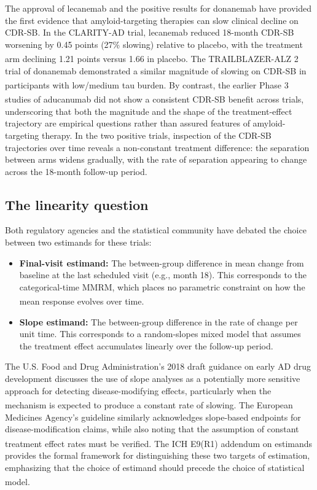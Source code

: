 \documentclass[
  11pt,
]{article}
\begin{document}
The approval of lecanemab and the positive results for
donanemab have provided the first evidence that
amyloid-targeting therapies can slow clinical decline on
CDR-SB. In the CLARITY-AD trial, lecanemab reduced 18-month
CDR-SB worsening by 0.45 points (27\% slowing) relative to
placebo, with the treatment arm declining 1.21 points
versus 1.66 in placebo\textsuperscript{}. The
TRAILBLAZER-ALZ 2 trial of donanemab demonstrated a similar
magnitude of slowing on CDR-SB in participants with
low/medium tau burden\textsuperscript{}. By contrast, the
earlier Phase 3 studies of aducanumab did not show a
consistent CDR-SB benefit across trials\textsuperscript{}, underscoring that both the magnitude
and the shape of the treatment-effect trajectory are
empirical questions rather than assured features of
amyloid-targeting therapy. In the two positive trials,
inspection of the CDR-SB trajectories over time reveals a
non-constant treatment difference: the separation between
arms widens gradually, with the rate of separation
appearing to change across the 18-month follow-up period.

\subsection{The linearity question}\label{the-linearity-question}

Both regulatory agencies and the statistical community have
debated the choice between two estimands for these trials:

\begin{itemize}
\item
  \textbf{Final-visit estimand:} The between-group difference in
  mean change from baseline at the last scheduled visit
  (e.g., month 18). This corresponds to the categorical-time
  MMRM, which places no parametric constraint on how the mean
  response evolves over time\textsuperscript{}.
\item
  \textbf{Slope estimand:} The between-group difference in the
  rate of change per unit time. This corresponds to a
  random-slopes mixed model that assumes the treatment
  effect accumulates linearly over the follow-up period.
\end{itemize}

The U.S. Food and Drug Administration's 2018 draft guidance
on early AD drug development discusses the use of slope
analyses as a potentially more sensitive approach for
detecting disease-modifying effects, particularly when the
mechanism is expected to produce a constant rate of slowing\textsuperscript{}. The European Medicines Agency's guideline
similarly acknowledges slope-based endpoints for
disease-modification claims, while also noting that the
assumption of constant treatment effect rates must be
verified\textsuperscript{}. The ICH E9(R1) addendum on
estimands provides the formal framework for distinguishing
these two targets of estimation, emphasizing that the choice
of estimand should precede the choice of statistical model\textsuperscript{}.
\end{document}

